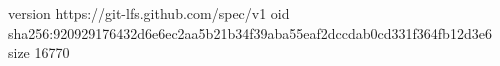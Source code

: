 version https://git-lfs.github.com/spec/v1
oid sha256:920929176432d6e6ec2aa5b21b34f39aba55eaf2dccdab0cd331f364fb12d3e6
size 16770
